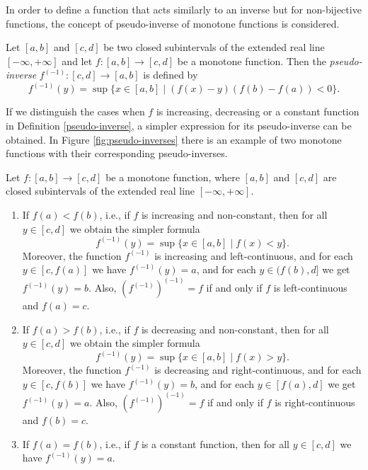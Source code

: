 In order to define a function that acts similarly to an inverse but for non-bijective functions, the concept of pseudo-inverse of monotone functions is considered.
\begin{definition}\label{pseudo-inverse} Let $[a,b]$ and $[c,d]$ be two closed subintervals of the extended real line $[-\infty,+\infty]$ and let $f:[a,b] \rightarrow [c,d]$ be a monotone function. Then the \emph{pseudo-inverse} $f^{(-1)}:[c,d] \rightarrow [a,b]$ is defined by
	$$f^{(-1)}(y)=\sup\{ x \in [a,b] \mid (f(x)-y)(f(b)-f(a)) <0 \}.$$
\end{definition}
If we distinguish the cases when $f$ is increasing, decreasing or a constant function in Definition \ref{pseudo-inverse}, a simpler expression for its pseudo-inverse can be obtained. In Figure \ref{fig:pseudo-inverses} there is an example of two monotone functions with their corresponding pseudo-inverses.
\begin{corollary}\label{cor:pseudo-inverse}
Let $f:[a,b] \rightarrow [c,d]$ be a monotone function, where $[a,b]$ and $[c,d]$ are closed subintervals of the extended real line $[-\infty,+\infty]$.
\begin{enumerate}[label=(\roman*)]
		\item If $f(a) < f(b)$, i.e., if $f$ is increasing and non-constant, then for all $y \in [c,d]$ we obtain the simpler formula
		$$f^{(-1)}(y) = \sup \{ x \in [a,b] \mid f(x)<y \}.$$
		Moreover, the function $f^{(-1)}$ is increasing and left-continuous, and for each $y \in [c,f(a)]$ we have $f^{(-1)}(y)=a$, and for each $ y \in (f(b),d]$ we get $f^{(-1)}(y)=b$. Also, $(f^{(-1)})^{(-1)}=f$ if and only if $f$ is left-continuous and $f(a)=c$.
		\item If $f(a)>f(b)$, i.e., if $f$ is decreasing and non-constant, then for all $y \in [c,d]$ we obtain the simpler formula
		$$f^{(-1)}(y)= \sup \{ x \in [a,b] \mid f(x)>y \}.$$
		Moreover, the function $f^{(-1)}$ is decreasing and right-continuous, and for each $y \in [c,f(b)]$ we have $f^{(-1)}(y)=b$, and for each $y \in [f(a),d]$ we get $f^{(-1)}(y)=a$. Also, $(f^{(-1)})^{(-1)}=f$ if and only if $f$ is right-continuous and $f(b)=c$.
		\item If $f(a)=f(b)$, i.e., if $f$ is a constant function, then for all $y \in [c,d]$ we have $f^{(-1)}(y)=a$.
	\end{enumerate}
\end{corollary}

